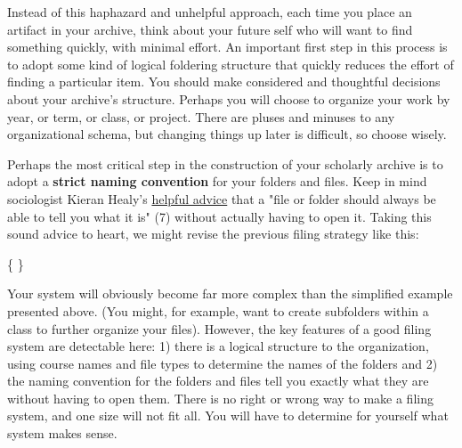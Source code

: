 Instead of this haphazard and unhelpful approach, each time you place an artifact in your archive, think about your future self who will want to find something quickly, with minimal effort. An important first step in this process is to adopt some kind of logical foldering structure that quickly reduces the effort of finding a particular item. You should make considered and thoughtful decisions about your archive's structure. Perhaps you will choose to organize your work by year, or term, or class, or project. There are pluses and minuses to any organizational schema, but changing things up later is difficult, so choose wisely. 

Perhaps the most critical step in the construction of your scholarly archive is to adopt a \textbf{strict naming convention} for your folders and files. Keep in mind sociologist Kieran Healy's \href{https://kieranhealy.org/files/papers/plain-person-text.pdf}{helpful advice} that a "file or folder should always be able to tell you what it is" (7) without actually having to open it. Taking this sound advice to heart, we might revise the previous filing strategy like this:

\medskip

{\large
{}
}

\begin{center} \{  \} \end{center}

Your system will obviously become far more complex than the simplified example presented above. (You might, for example, want to create subfolders within a class to further organize your files). However, the key features of a good filing system are detectable here: 1) there is a logical structure to the organization, using course names and file types to determine the names of the folders and 2) the naming convention for the folders and files tell you exactly what they are without having to open them. There is no right or wrong way to make a filing system, and one size will not fit all. You will have to determine for yourself what system makes sense. 

